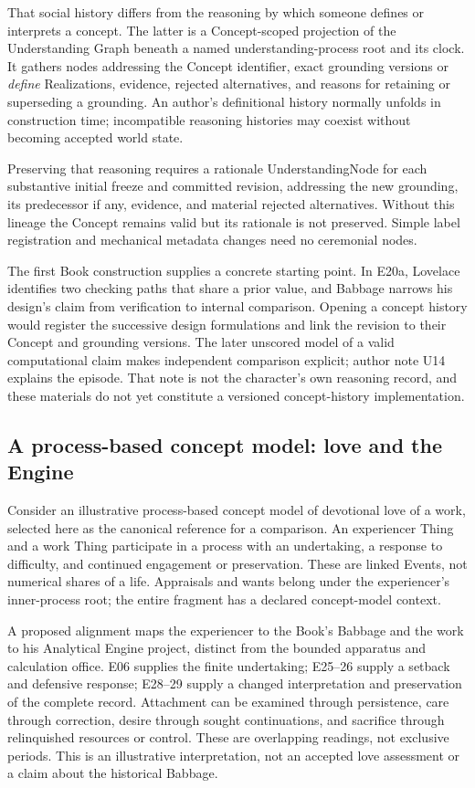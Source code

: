 \documentclass[11pt,a4paper]{article}
\begin{document}
That social history differs from the reasoning by which someone defines or
interprets a concept. The latter is a Concept-scoped projection of the
Understanding Graph beneath a named understanding-process root and its clock.
It gathers nodes addressing the Concept identifier, exact grounding versions
or \emph{define} Realizations, evidence, rejected alternatives, and reasons for
retaining or superseding a grounding. An author's definitional history
normally unfolds in construction time; incompatible reasoning histories may
coexist without becoming accepted world state.

Preserving that reasoning requires a rationale UnderstandingNode for each
substantive initial freeze and committed revision, addressing the new grounding,
its predecessor if any, evidence, and material rejected alternatives. Without this
lineage the Concept remains valid but its rationale is not preserved. Simple
label registration and mechanical metadata changes need no ceremonial nodes.

The first Book construction supplies a concrete starting point. In E20a, Lovelace identifies two
checking paths that share a prior value, and Babbage narrows his design's claim
from verification to internal comparison. Opening a concept history would
register the successive design formulations and link the revision to their
Concept and grounding versions. The later unscored model of a valid computational
claim makes independent comparison explicit; author note U14 explains the
episode. That note is not the character's own reasoning record, and these
materials do not yet constitute a versioned concept-history implementation.

\subsection{A process-based concept model: love and the Engine}

Consider an illustrative process-based concept model of devotional love of a
work, selected here as the canonical reference for a comparison. An
experiencer Thing and a work Thing participate in a process with an undertaking,
a response to difficulty, and continued engagement or preservation. These are
linked Events, not numerical shares of a life. Appraisals and wants belong
under the experiencer's inner-process root; the entire fragment has a declared
concept-model context.

A proposed alignment maps the experiencer to the Book's Babbage and the work
to his Analytical Engine project, distinct from the bounded apparatus and
calculation office. E06 supplies the finite undertaking; E25--26 supply a
setback and defensive response; E28--29 supply a changed interpretation and
preservation of the complete record. Attachment can be examined through
persistence, care through correction, desire through sought continuations, and
sacrifice through relinquished resources or control. These are overlapping
readings, not exclusive periods. This is an illustrative interpretation, not an
accepted love assessment or a claim about the historical Babbage.
\end{document}
